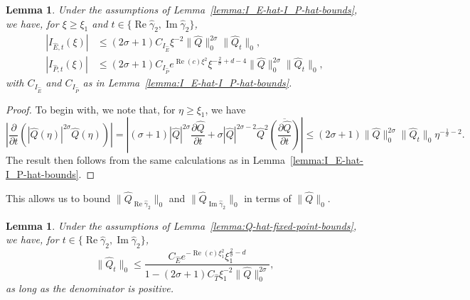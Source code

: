 \documentclass[11pt]{article}
\DeclareMathOperator{\real}{Re}
\DeclareMathOperator{\imag}{Im}
\newcommand{\conj}[1]{\overline{#1}}
\newtheorem{lemma}[definition]{Lemma}
\begin{document}
\begin{lemma}\label{lemma:I_E-hat-I_P-hat-dgamma-bounds}
  Under the assumptions of Lemma~\ref{lemma:I_E-hat-I_P-hat-bounds},
  we have, for \(\xi \geq \xi_{1}\) and
  \(t \in \{\real\hat{\gamma}_{2}, \imag\hat{\gamma}_{2}\}\),
  \begin{align*}
    |I_{\hat{E},t}(\xi)| &\leq (2\sigma + 1)C_{I_{\hat{E}}}\xi^{-2}\|\hat{Q}\|_{0}^{2\sigma}\|\hat{Q}_{t}\|_{0},\\
    |I_{\hat{P},t}(\xi)| &\leq (2\sigma + 1)C_{I_{\hat{P}}}e^{\real(c)\xi^{2}}\xi^{-\frac{2}{\sigma} + d - 4}\|\hat{Q}\|_{0}^{2\sigma}\|\hat{Q}_{t}\|_{0},
  \end{align*}
  with \(C_{I_{\hat{E}}}\) and \(C_{I_{\hat{P}}}\) as in
  Lemma~\ref{lemma:I_E-hat-I_P-hat-bounds}.
\end{lemma}

\begin{proof}
  To begin with, we note that, for \(\eta \geq \xi_{1}\), we have
  \begin{equation*}
    \left|\frac{\partial}{\partial t}\left(|\hat{Q}(\eta)|^{2\sigma}\hat{Q}(\eta)\right)\right|
    = \left|
      (\sigma + 1)|\hat{Q}|^{2\sigma}\frac{\partial \hat{Q}}{\partial t}
      + \sigma|\hat{Q}|^{2\sigma - 2}\hat{Q}^{2}\conj{\left(\frac{\partial \hat{Q}}{\partial t}\right)}
    \right|
    \leq (2\sigma + 1)\|\hat{Q}\|_{0}^{2\sigma}\|\hat{Q}_{t}\|_{0}\eta^{-\frac{1}{\sigma} - 2}.
  \end{equation*}
  The result then follows from the same calculations as in
  Lemma~\ref{lemma:I_E-hat-I_P-hat-bounds}.
\end{proof}

This allows us to bound \(\|\hat{Q}_{\real\hat{\gamma}_{2}}\|_{0}\)
and \(\|\hat{Q}_{\imag\hat{\gamma}_{2}}\|_{0}\) in terms of
\(\|\hat{Q}\|_{0}\).

\begin{lemma}\label{lemma:Q-hat-dgamma-bound}
  Under the assumptions of Lemma~\ref{lemma:Q-hat-fixed-point-bounds},
  we have, for
  \(t \in \{\real\hat{\gamma}_{2}, \imag\hat{\gamma}_{2}\}\),
  \begin{equation*}
    \|\hat{Q}_{t}\|_{0} \leq \frac{
      C_{\hat{E}}e^{-\real(c)\xi_{1}^{2}}\xi_{1}^{\frac{2}{\sigma} - d}
    }{1 - (2\sigma + 1)C_{\hat{T}}\xi_{1}^{-2}\|\hat{Q}\|_{0}^{2\sigma}},
  \end{equation*}
  as long as the denominator is positive.
\end{lemma}
\end{document}
